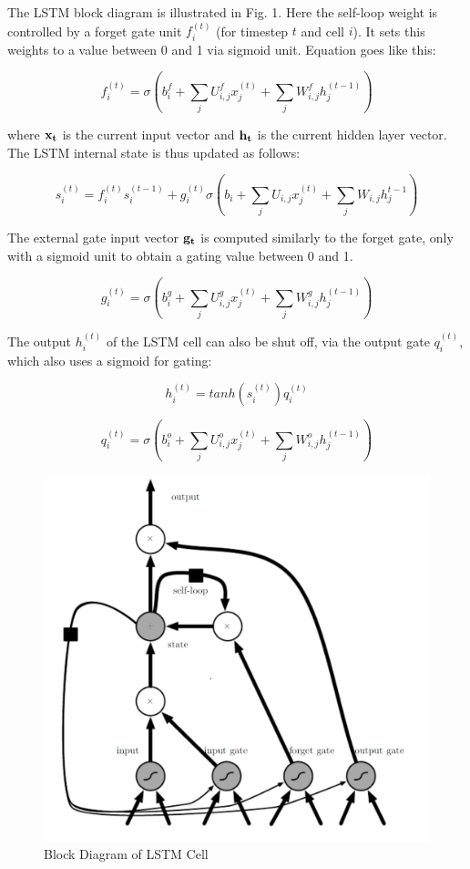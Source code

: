 \documentclass[10pt,a4paper]{article}
\begin{document}
\begin{spacing}{1.5}
		The LSTM block diagram is illustrated in Fig. 1. Here the self-loop weight is controlled by a forget gate unit $f_i^{(t)}$ (for timestep $t$ and cell $i$). It sets this weights to a value between 0 and 1 via sigmoid unit. Equation goes like this:
		
		\begin{equation}
		f_i^{(t)} = \sigma (b_i^f + \sum_j U_{i,j}^f x_j^{(t)} + \sum_j W_{i,j}^f h_j^{(t-1)})
		\end{equation}
		
		where $\bf{x}_t$ is the current input vector and $\bf{h}_t$ is the current hidden layer vector. The LSTM internal state is thus updated as follows:
		
		\begin{equation}
		s_i^{(t)} = f_i^{(t)} s_i^{(t-1)}+ g_i^{(t)} \sigma ( b_i + \sum_j U_{i,j}x_j^{(t)}+ \sum_j W_{i,j} h_j^{t-1})
		\end{equation}
		
		The external gate input vector $\bf{g}_t$ is computed similarly to the forget gate, only with a sigmoid unit to obtain a gating value between 0 and 1.
		
		\begin{equation}
		g_i^{(t)} = \sigma (b_i^g + \sum_j U_{i,j}^g x_j^{(t)} + \sum_j W_{i,j}^g h_j ^{(t-1)})
		\end{equation}
		
		The output $h_i^{(t)}$ of the LSTM cell can also be shut off, via the output gate $q_i^{(t)}$, which also uses a sigmoid for gating:
		
		\begin{equation}
		h_i^{(t)} = tanh(s_i^{(t)})q_i^{(t)}
		\end{equation}
		
		\begin{equation}
		q_i^{(t)} = \sigma (b_i^o + \sum_j U_{i,j}^o x_j^{(t)}+ \sum_j W_{i,j}^o h_j^{(t-1)})
		\end{equation}
		
		\begin{figure}[H]
			\centering
			\includegraphics[width = 10 cm]{pic/1.png}
			\caption{Block Diagram of LSTM Cell}
		\end{figure}
		

\end{spacing}
\end{document}
